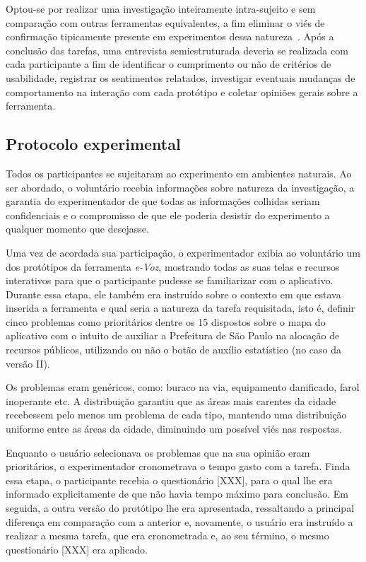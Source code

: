 \documentclass{sigchi}
\begin{document}
Optou-se por realizar uma investigação inteiramente intra-sujeito e sem comparação com outras ferramentas equivalentes, a fim eliminar o viés de confirmação tipicamente presente em experimentos dessa natureza~\cite{dell:2012}. Após a conclusão das tarefas, uma entrevista semiestruturada deveria se realizada com cada participante a fim de identificar o cumprimento ou não de critérios de usabilidade, registrar os sentimentos relatados, investigar eventuais mudanças de comportamento na interação com cada protótipo e coletar opiniões gerais sobre a ferramenta.

\subsection{Protocolo experimental}
Todos os participantes se sujeitaram ao experimento em ambientes naturais. Ao ser abordado, o voluntário recebia informações sobre natureza da investigação, a garantia do experimentador de que todas as informações colhidas seriam confidenciais e o compromisso de que ele poderia desistir do experimento a qualquer momento que desejasse.

Uma vez de acordada sua participação, o experimentador exibia ao voluntário um dos protótipos da ferramenta \textit{e-Voz}, mostrando todas as suas telas e recursos interativos para que o participante pudesse se familiarizar com o aplicativo. Durante essa etapa, ele também era instruído sobre o contexto em que estava inserida a ferramenta e qual seria a natureza da tarefa requisitada, isto é, definir cinco problemas como prioritários dentre os 15 dispostos sobre o mapa do aplicativo com o intuito de auxiliar a Prefeitura de São Paulo na alocação de recursos públicos, utilizando ou não o botão de auxílio estatístico (no caso da versão II).

Os problemas eram genéricos, como: buraco na via, equipamento danificado, farol inoperante etc.
A distribuição garantiu que as áreas mais carentes da cidade recebessem pelo menos um problema de cada tipo, mantendo uma distribuição uniforme entre as áreas da cidade, diminuindo um possível viés nas respostas.

Enquanto o usuário selecionava os problemas que na sua opinião eram prioritários, o experimentador cronometrava o tempo gasto com a tarefa. Finda essa etapa, o participante recebia o questionário [XXX], para o qual lhe era informado explicitamente de que não havia tempo máximo para conclusão. Em seguida, a outra versão do protótipo lhe era apresentada, ressaltando a principal diferença em comparação com a anterior e, novamente, o usuário era instruído a realizar a mesma tarefa, que era cronometrada e, ao seu término, o mesmo questionário [XXX] era aplicado.
\end{document}
